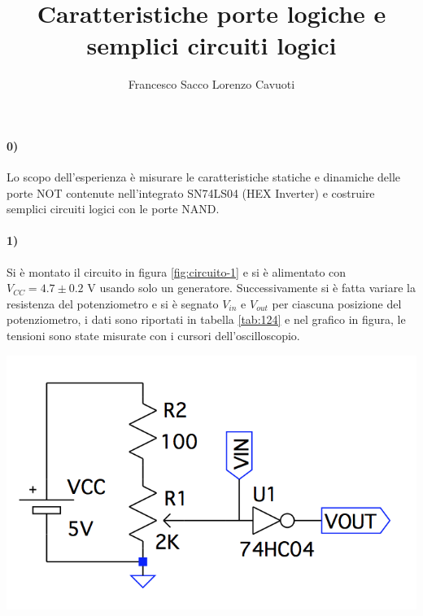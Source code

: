 \documentclass{article}
\date{}
\author{Francesco Sacco Lorenzo Cavuoti}
\title{Caratteristiche porte logiche e semplici circuiti logici}
\begin{document}
\maketitle
\paragraph{0)}
	Lo scopo dell'esperienza è misurare le caratteristiche statiche e dinamiche delle porte NOT contenute nell’integrato SN74LS04 (HEX Inverter) e costruire semplici circuiti logici con le porte NAND.
	
\paragraph{1)}
	Si è montato il circuito in figura \ref{fig:circuito-1} e si è alimentato con $V_{CC}=4.7\pm0.2$ V usando solo un generatore. Successivamente si è fatta variare la resistenza del potenziometro e si è segnato $V_{in}$ e $V_{out}$ per ciascuna posizione del potenziometro, i dati sono riportati in tabella \ref{tab:124} e nel grafico in figura, le tensioni sono state misurate con i cursori dell'oscilloscopio.\newline

	\begin{minipage}{.6\linewidth}
		\centering
		\includegraphics[width=\linewidth]{figure/circuito1}
		\label{fig:circuito-1}
	\end{minipage}
	\begin{minipage}{.4\linewidth}
		
		\label{tab:124}
	\end{minipage}\newline\newline
\end{document}
